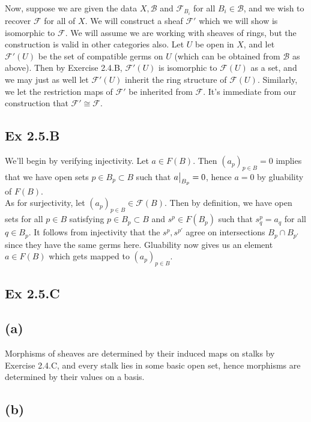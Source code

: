 \documentclass{article}
\newcommand\restr[2]{{%
  \left.\kern-\nulldelimiterspace %
  #1 %
  \vphantom{\big|} %
  \right|_{#2} %
  }}
\theoremstyle{definition}
\begin{document}
Now, suppose we are given the data $X, \mathcal{B}$ and $\mathcal{F}_{B_i}$ for
all $B_i \in \mathcal{B}$, and we wish to recover $\mathcal{F}$ for all of $X$.
We will construct a sheaf $\mathcal{F}'$ which we will show is isomorphic to
$\mathcal{F}$. We will assume we are working with sheaves of rings, but the
construction is valid in other categories also. Let $U$ be open in $X$, and let
$\mathcal{F}'(U)$ be the set of compatible germs on $U$ (which can be obtained
from $\mathcal{B}$ as above). Then by Exercise 2.4.B, $\mathcal{F}'(U)$ is
isomorphic to $\mathcal{F}(U)$ as a set, and we may just as well let
$\mathcal{F}'(U)$ inherit the ring structure of $\mathcal{F}(U)$. Similarly, we
let the restriction maps of $\mathcal{F}'$ be inherited from $\mathcal{F}$.
It's immediate from our construction that $\mathcal{F}' \cong \mathcal{F}$.

\subsection*{Ex 2.5.B}

We'll begin by verifying injectivity. Let $a \in F(B)$. Then $(a_p)_{p \in B} =
	0$ implies that we have open sets $p \in B_p \subset B$ such that
$\restr{a}{B_p} = 0$, hence $a = 0$ by gluability of $F(B)$. \\

As for surjectivity, let $(a_p)_{p \in B} \in \mathcal{F}(B)$. Then by
definition, we have open sets for all $p \in B$ satisfying $p \in B_p \subset
	B$ and $s^p \in F(B_p)$ such that $s^p_q = a_q$ for all $q \in B_p$. It follows
from injectivity that the $s^p, s^{p'}$ agree on intersections $B_p \cap
	B_{p'}$ since they have the same germs here. Gluability now gives us an element
$a \in F(B)$ which gets mapped to $(a_p)_{p \in B}$.

\subsection*{Ex 2.5.C}

\subsection*{(a)}

Morphisms of sheaves are determined by their induced maps on stalks by Exercise
2.4.C, and every stalk lies in some basic open set, hence morphisms are
determined by their values on a basis.

\subsection*{(b)}
\end{document}
